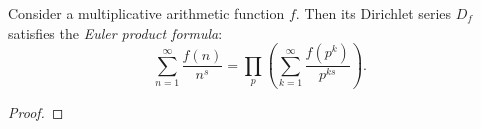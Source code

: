 \begin{theorem}
  Consider a multiplicative arithmetic function $f$. Then its Dirichlet series $D_f$ satisfies the \emph{Euler product formula}:
  \begin{equation*}
    \sum_{n=1}^\infty\frac{f(n)}{n^s} = \prod_{p}\left(\sum_{k=1}^{\infty}\frac{f(p^k)}{p^{ks}}\right).
  \end{equation*}
\end{theorem}

\begin{proof}
  
\end{proof}

